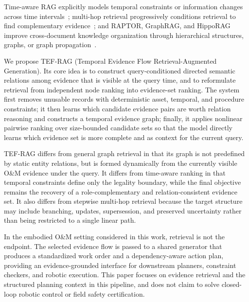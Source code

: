  Time-aware RAG explicitly models temporal constraints or information changes across time intervals~\cite{zhang2025mrag,lau2025tarag}; multi-hop retrieval progressively conditions retrieval to find complementary evidence~\cite{xiong2021mdr,trivedi2023ircot}; and RAPTOR, GraphRAG, and HippoRAG improve cross-document knowledge organization through hierarchical structures, graphs, or graph propagation~\cite{sarthi2024raptor,edge2024graphrag,gutierrez2024hipporag}. %

We propose TEF-RAG (Temporal Evidence Flow Retrieval-Augmented Generation). Its core idea is to construct query-conditioned directed semantic relations among evidence that is visible at the query time, and to reformulate retrieval from independent node ranking into evidence-set ranking. The system first removes unusable records with deterministic asset, temporal, and procedure constraints; it then learns which candidate evidence pairs are worth relation reasoning and constructs a temporal evidence graph; finally, it applies nonlinear pairwise ranking over size-bounded candidate sets %
so that the model directly learns which evidence set is more complete and  as context for the current query.

TEF-RAG differs from general graph retrieval in that its graph is not predefined by static entity relations, but is formed dynamically from the currently visible O\&M evidence under the query. It differs from time-aware ranking in that temporal constraints define only the legality boundary, while the final objective remains the recovery of a role-complementary and relation-consistent evidence set. It also differs from stepwise multi-hop retrieval because the target structure may include branching, updates, supersession, and preserved uncertainty rather than being restricted to a single linear path.

In the embodied O\&M setting considered in this work, retrieval is not the endpoint. The selected evidence flow is passed to a shared generator that produces a standardized work order and a dependency-aware action plan, providing an evidence-grounded interface for downstream planners, constraint checkers, and robotic execution. This paper focuses on evidence retrieval and the structured planning context in this pipeline, and does not claim to solve closed-loop robotic control or field safety certification.

